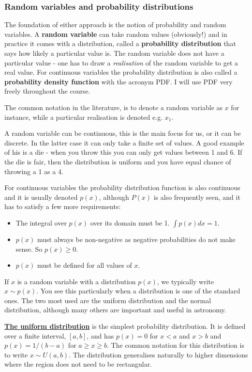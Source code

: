 \documentclass[a4paper,10pt]{article}
\newcommand{\link}[2]{{\color{blue}\href{#1}{#2}}}
\begin{document}
\subsubsection{ Random variables and probability distributions}
The foundation of either approach is the notion of probability and random variables. A \textbf{random variable} can take random values (obviously!) and in practice it comes with a distribution, called a \textbf{probability distribution} that says how likely a particular value is. The random variable does not have a particular value - one has to draw a \textit{realisation} of the random variable to get a real value. For continuous variables the probability distribution is also called a \textbf{probability density function} with the acronym PDF. I will use PDF very freely throughout the course.

The common notation in the literature, is to denote a random variable as $x$ for instance, while a particular realisation is denoted e.g. $x_1$.

A random variable can be continuous, this is the main focus for us, or it can be discrete. In the latter case it can only take a finite set of values. A good example of his is a die - when you throw this you can only get values between 1 and 6. If the die is fair, then the distribution is uniform and you have equal chance of throwing a 1 as a 4.

For continuous variables the probability distribution function is also continuous and it is usually denoted $p(x)$, although $P(x)$ is also frequently seen, and it has to satisfy a few more requirements:

\begin{itemize}
\item The integral over $p(x)$ over its domain must be 1. $\int p(x) dx = 1$.
\item $p(x)$ must always be non-negative as negative probabilities do not make sense. So $p(x)\ge 0$.
\item $p(x)$ must be defined for all values of $x$.
\end{itemize}

If $x$ is a random variable with a distribution $p(x)$, we typically write $x\sim p(x)$. You see this particularly when a distribution is one of the standard ones. The two most used are the uniform distribution and the normal distribution, although many others are important and useful in astronomy. 


\link{https://en.wikipedia.org/wiki/Uniform_distribution_(continuous)}{\textbf{The uniform distribution}} is the simplest probability distribution. It is defined over a finite interval, $[a, b]$, and has $p(x)=0$ for $x<a$ and $x>b$ and $p(x) = 1/(b-a)$ for $a\ge x \ge b$. The common notation for this distribution is to write $x\sim U(a, b)$. The distribution generalises naturally to higher dimensions where the region does not need to be rectangular.
\end{document}
